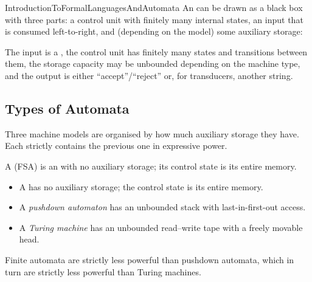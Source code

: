 \documentclass[hidelinks]{article}
\begin{document}
\begin{smodule}[title={Introduction to Formal Languages and Automata}]{IntroductionToFormalLanguagesAndAutomata}
An  can be drawn as a black box with three parts: a control unit with finitely many internal states, an input that is consumed left-to-right, and (depending on the model) some auxiliary storage:
\begin{center}
\end{center}
The input is a , the control unit has finitely many states and transitions between them, the storage capacity may be unbounded depending on the machine type, and the output is either ``accept''/``reject'' or, for transducers, another string.

\subsection{Types of Automata}

Three machine models are organised by how much auxiliary storage they have. Each strictly contains the previous one in expressive power.

\begin{sdefinition}[for=finite-state automaton]
    A  (FSA) is an  with no auxiliary storage; its control state is its entire memory.
\end{sdefinition}

\begin{itemize}
  \item A  has no auxiliary storage; the control state is its entire memory.
  \item A \emph{pushdown automaton} has an unbounded stack with last-in-first-out access.
  \item A \emph{Turing machine} has an unbounded read--write tape with a freely movable head.
\end{itemize}
Finite automata are strictly less powerful than pushdown automata, which in turn are strictly less powerful than Turing machines.


\end{smodule}
\end{document}
